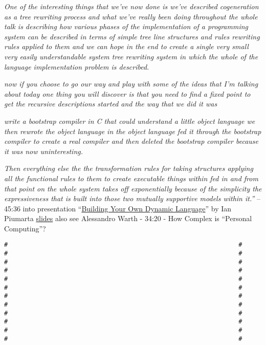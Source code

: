 \emph{One of the interesting things that we've now done is we've
described cogeneration as a tree rewriting process and what we've really
been doing throughout the whole talk is describing how various phases of
the implementation of a programming system can be described in terms of
simple tree line structures and rules rewriting rules applied to them
and we can hope in the end to create a single very small very easily
understandable system tree rewriting system in which the whole of the
language implementation problem is described.}

\emph{now if you choose to go our way and play with some of the ideas
that I'm talking about today one thing you will discover is that you
need to find a fixed point to get the recursive descriptions started and
the way that we did it was}

\emph{write a bootstrap compiler in C that could understand a little
object language we then rewrote the object language in the object
language fed it through the bootstrap compiler to create a real compiler
and then deleted the bootstrap compiler because it was now
uninteresting.}

\emph{Then everything else the the transformation rules for taking
structures applying all the functional rules to them to create
executable things within fed in and from that point on the whole system
takes off exponentially because of the simplicity the expressiveness
that is built into those two mutually supportive models within it.''} --
45:36 into presentation ``\href{https://youtu.be/cn7kTPbW6QQ}{Building
Your Own Dynamic Language}'' by Ian Piumarta
\href{https://www.piumarta.com/papers/EE380-2007-slides.pdf}{slides}
also see Alessandro Warth - 34:20 - How Complex is ``Personal
Computing''?

\begin{verbatim}
#                                                               #
#                                                               #
#                                                               #
#                                                               #
#                                                               #
#                                                               #
#                                                               #
#                                                               #
#                                                               #
#                                                               #
#                                                               #
#                                                               #
\end{verbatim}


